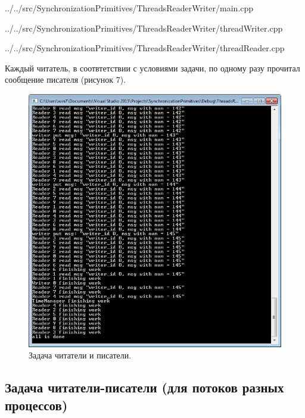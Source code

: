 \documentclass[a4paper, 12pt]{article}		%
\begin{document}

{../../src/SynchronizationPrimitives/ThreadsReaderWriter/main.cpp}


{../../src/SynchronizationPrimitives/ThreadsReaderWriter/threadWriter.cpp}


{../../src/SynchronizationPrimitives/ThreadsReaderWriter/threadReader.cpp}
\newpage

Каждый читатель, в соотвтетствии с условиями задачи, по одному разу прочитал сообщение писателя (рисунок 7).

\begin{figure}[h!]
\centering
\includegraphics[scale=1]{res/006}
\caption{Задача читатели и писатели.}
\end{figure}


\newpage
\subsection{Задача читатели-писатели (для потоков разных процессов)}
\end{document}
